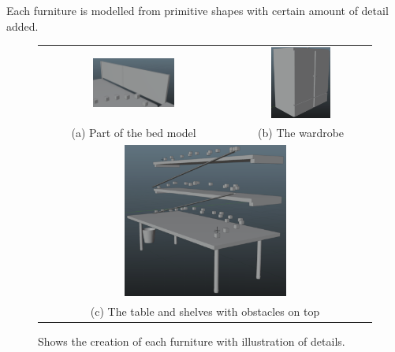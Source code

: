 \documentclass[12pt, a4paper, oneside]{article}
\begin{document}
    Each furniture is modelled from primitive shapes with certain amount of detail added.

    \begin{figure}[H]
        \begin{tabular}{cc}
            \includegraphics[width=0.45\textwidth]{house_detail1.png} & \includegraphics[width=0.45\textwidth]{house_detail2.png} \\
            (a) Part of the bed model & (b) The wardrobe \\
            \multicolumn{2}{c}{\includegraphics[width=0.5\textwidth]{house_detail3.png}} \\
            \multicolumn{2}{c}{(c) The table and shelves with obstacles on top}
        \end{tabular}
        \caption{Shows the creation of each furniture with illustration of details.}
    \end{figure}
\end{document}
